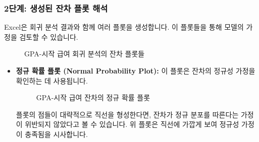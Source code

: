 \documentclass[11pt,a4paper]{article}
\theoremstyle{definition}
\begin{document}
\subsubsection{2단계: 생성된 잔차 플롯 해석}
Excel은 회귀 분석 결과와 함께 여러 플롯을 생성합니다. 이 플롯들을 통해 모델의 가정을 검토할 수 있습니다.

\begin{figure}[h!]
    \centering
    \caption{GPA-시작 급여 회귀 분석의 잔차 플롯들}
    \label{fig:gpa_salary_plots}
\end{figure}

\begin{itemize}
    \item \textbf{정규 확률 플롯 (Normal Probability Plot):}
    이 플롯은 잔차의 정규성 가정을 확인하는 데 사용됩니다.
    \begin{figure}[h!]
        \centering
        \caption{GPA-시작 급여 잔차의 정규 확률 플롯}
        \label{fig:gpa_salary_normal_plot}
    \end{figure}
    \begin{tcolorbox}[colback=lightblue,colframe=darkblue,title={정규성 가정 확인}]
    플롯의 점들이 대략적으로 직선을 형성한다면, 잔차가 정규 분포를 따른다는 가정이 위반되지 않았다고 볼 수 있습니다. 위 플롯은 직선에 가깝게 보여 정규성 가정이 충족됨을 시사합니다.
    \end{tcolorbox}


\end{itemize}
\end{document}
